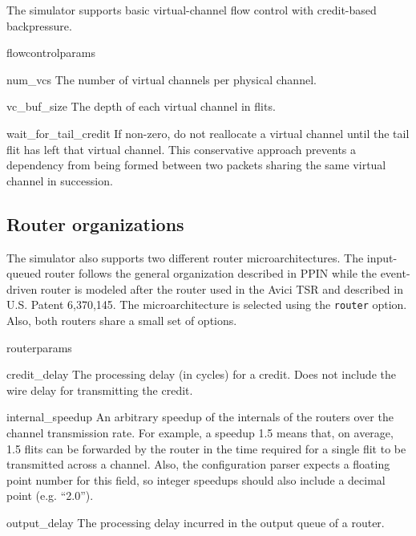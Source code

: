 \documentclass[11pt]{article}
\begin{document}
The simulator supports basic virtual-channel flow control with
credit-based backpressure.  

\begin{opt_list}{flowcontrolparams}

\item[num\_vcs] The number of virtual channels per physical channel.

\item[vc\_buf\_size] The depth of each virtual channel in flits.


  
\item[wait\_for\_tail\_credit] If non-zero, do not reallocate a virtual
channel until the tail flit has left that virtual channel.  This
conservative approach prevents a dependency from being formed between
two packets sharing the same virtual channel in succession.
\end{opt_list}

\subsection{Router organizations}

The simulator also supports two different router microarchitectures.
The input-queued router follows the general organization described in
PPIN while the event-driven router is modeled after the router used in
the Avici TSR and described in U.S. Patent 6,370,145.  The
microarchitecture is selected using the \texttt{router} option.  Also,
both routers share a small set of options.

\begin{opt_list}{routerparams}
\item[credit\_delay] The processing delay (in cycles) for a credit.
Does not include the wire delay for transmitting the credit.

\item[internal\_speedup] An arbitrary speedup of the internals of the
routers over the channel transmission rate.  For example, a speedup
1.5 means that, on average, 1.5 flits can be forwarded by the router
in the time required for a single flit to be transmitted across a
channel.  Also, the configuration parser expects a floating point
number for this field, so integer speedups should also include a
decimal point (e.g. ``2.0'').

\item[output\_delay] The processing delay incurred in the output queue
of a router.
\end{opt_list}
\end{document}
